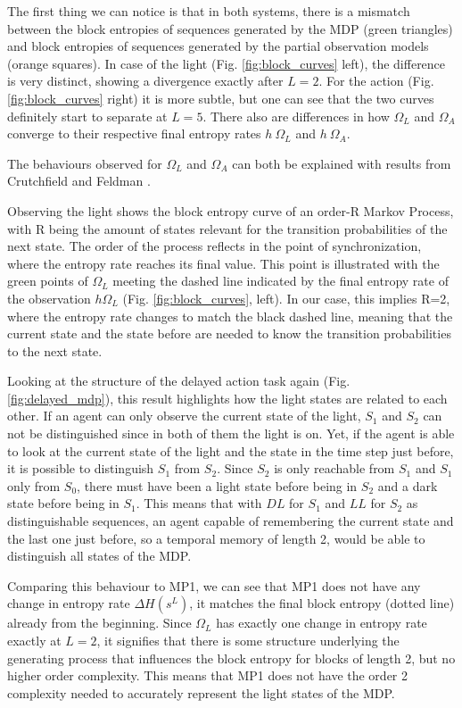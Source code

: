 \documentclass[12pt,a4paper]{article}
\begin{document}
The first thing we can notice is that in both systems, there is a mismatch between the block entropies of sequences generated by the MDP (green triangles) and block entropies of sequences generated by the partial observation models (orange squares).
In case of the light (Fig. \ref{fig:block_curves} left), the difference is very distinct, showing a divergence exactly after $L=2$.
For the action (Fig. \ref{fig:block_curves} right) it is more subtle, but one can see that the two curves definitely start to separate at $L=5$.
There also are differences in how $\Omega_L$ and $\Omega_A$ converge to their respective final entropy rates $h\ \Omega_L$ and $h\ \Omega_A$.

The behaviours observed for $\Omega_L$ and $\Omega_A$ can both be explained with results from Crutchfield and Feldman \autocite{crutchfield2003regularities}.

Observing the light shows the block entropy curve of an order-R Markov Process, with R being the amount of states relevant for the transition probabilities of the next state.
The order of the process reflects in the point of synchronization, where the entropy rate reaches its final value.
This point is illustrated with the green points of $\Omega_L$ meeting the dashed line indicated by the final entropy rate of the observation $h \Omega_L$ (Fig. \ref{fig:block_curves}, left).
In our case, this implies R=2, where the entropy rate changes to match the black dashed line, meaning that the current state and the state before are needed to know the transition probabilities to the next state.

Looking at the structure of the delayed action task again (Fig. \ref{fig:delayed_mdp}), this result highlights how the light states are related to each other.
If an agent can only observe the current state of the light, $S_1$ and $S_2$ can not be distinguished since in both of them the light is on.
Yet, if the agent is able to look at the current state of the light and the state in the time step just before, it is possible to distinguish $S_1$ from $S_2$. 
Since $S_2$ is only reachable from $S_1$ and $S_1$ only from $S_0$, there must have been a light state before being in $S_2$ and a dark state before being in $S_1$.
This means that with $DL$ for $S_1$ and $LL$ for $S_2$ as distinguishable sequences, an agent capable of remembering the current state and the last one just before, so a temporal memory of length 2, would be able to distinguish all states of the MDP.

Comparing this behaviour to MP1, we can see that MP1 does not have any change in entropy rate $\Delta H(s^L)$, it matches the final block entropy (dotted line) already from the beginning.
Since $\Omega_L$ has exactly one change in entropy rate exactly at $L=2$, it signifies that there is some structure underlying the generating process that influences the block entropy for blocks of length 2, but no higher order complexity.
This means that MP1 does not have the order 2 complexity needed to accurately represent the light states of the MDP.
\end{document}
